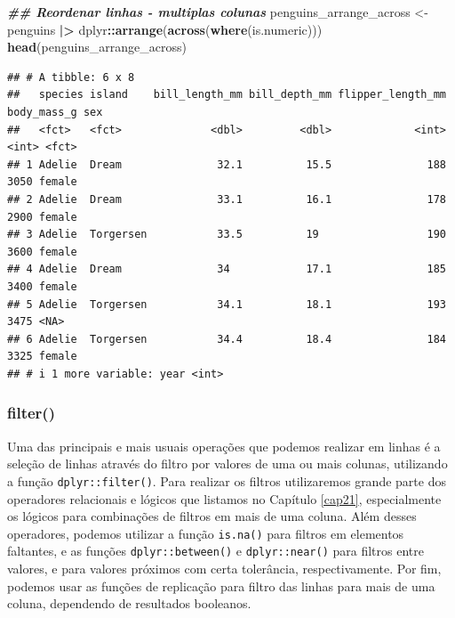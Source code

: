 \documentclass[
]{article}
\newenvironment{Shaded}{\begin{snugshade}}{\end{snugshade}}
\newcommand{\DocumentationTok}[1]{\textcolor[rgb]{0.56,0.35,0.01}{\textbf{\textit{#1}}}}
\newcommand{\FunctionTok}[1]{\textcolor[rgb]{0.13,0.29,0.53}{\textbf{#1}}}
\newcommand{\NormalTok}[1]{#1}
\newcommand{\OtherTok}[1]{\textcolor[rgb]{0.56,0.35,0.01}{#1}}
\newcommand{\SpecialCharTok}[1]{\textcolor[rgb]{0.81,0.36,0.00}{\textbf{#1}}}
\begin{document}
\begin{Shaded}
\begin{Highlighting}[]
\DocumentationTok{\#\# Reordenar linhas {-} multiplas colunas}
\NormalTok{penguins\_arrange\_across }\OtherTok{\textless{}{-}}\NormalTok{ penguins }\SpecialCharTok{|\textgreater{}} 
\NormalTok{    dplyr}\SpecialCharTok{::}\FunctionTok{arrange}\NormalTok{(}\FunctionTok{across}\NormalTok{(}\FunctionTok{where}\NormalTok{(is.numeric)))}
\FunctionTok{head}\NormalTok{(penguins\_arrange\_across)}
\end{Highlighting}
\end{Shaded}

\begin{verbatim}
## # A tibble: 6 x 8
##   species island    bill_length_mm bill_depth_mm flipper_length_mm body_mass_g sex   
##   <fct>   <fct>              <dbl>         <dbl>             <int>       <int> <fct> 
## 1 Adelie  Dream               32.1          15.5               188        3050 female
## 2 Adelie  Dream               33.1          16.1               178        2900 female
## 3 Adelie  Torgersen           33.5          19                 190        3600 female
## 4 Adelie  Dream               34            17.1               185        3400 female
## 5 Adelie  Torgersen           34.1          18.1               193        3475 <NA>  
## 6 Adelie  Torgersen           34.4          18.4               184        3325 female
## # i 1 more variable: year <int>
\end{verbatim}

\hypertarget{filter}{%
\subsubsection{filter()}\label{filter}}

Uma das principais e mais usuais operações que podemos realizar em linhas é a seleção de linhas através do filtro por valores de uma ou mais colunas, utilizando a função \texttt{dplyr::filter()}. Para realizar os filtros utilizaremos grande parte dos operadores relacionais e lógicos que listamos no Capítulo \ref{cap21}, especialmente os lógicos para combinações de filtros em mais de uma coluna. Além desses operadores, podemos utilizar a função \texttt{is.na()} para filtros em elementos faltantes, e as funções \texttt{dplyr::between()} e \texttt{dplyr::near()} para filtros entre valores, e para valores próximos com certa tolerância, respectivamente. Por fim, podemos usar as funções de replicação para filtro das linhas para mais de uma coluna, dependendo de resultados booleanos.
\end{document}
